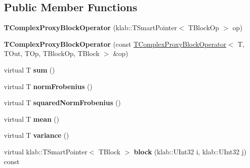 \subsection*{Public Member Functions}
\begin{DoxyCompactItemize}
\item 
{\bfseries T\+Complex\+Proxy\+Block\+Operator} (klab\+::\+T\+Smart\+Pointer$<$ T\+Block\+Op $>$ op)\hypertarget{classkl1p_1_1TComplexProxyBlockOperator_a2f962ad972aaf8f9b4702dd5d80eced9}{}\label{classkl1p_1_1TComplexProxyBlockOperator_a2f962ad972aaf8f9b4702dd5d80eced9}

\item 
{\bfseries T\+Complex\+Proxy\+Block\+Operator} (const \hyperlink{classkl1p_1_1TComplexProxyBlockOperator}{T\+Complex\+Proxy\+Block\+Operator}$<$ T, T\+Out, T\+Op, T\+Block\+Op, T\+Block $>$ \&op)\hypertarget{classkl1p_1_1TComplexProxyBlockOperator_a04722c553f55607508c6526e43ade887}{}\label{classkl1p_1_1TComplexProxyBlockOperator_a04722c553f55607508c6526e43ade887}

\item 
virtual T {\bfseries sum} ()\hypertarget{classkl1p_1_1TComplexProxyBlockOperator_aec11a1961928456a0fcf2d6e9fd72d48}{}\label{classkl1p_1_1TComplexProxyBlockOperator_aec11a1961928456a0fcf2d6e9fd72d48}

\item 
virtual T {\bfseries norm\+Frobenius} ()\hypertarget{classkl1p_1_1TComplexProxyBlockOperator_a3a616c71aca28467321febb8d5df0ab2}{}\label{classkl1p_1_1TComplexProxyBlockOperator_a3a616c71aca28467321febb8d5df0ab2}

\item 
virtual T {\bfseries squared\+Norm\+Frobenius} ()\hypertarget{classkl1p_1_1TComplexProxyBlockOperator_a0e4b35d5b1a497d46d2159f584f5887c}{}\label{classkl1p_1_1TComplexProxyBlockOperator_a0e4b35d5b1a497d46d2159f584f5887c}

\item 
virtual T {\bfseries mean} ()\hypertarget{classkl1p_1_1TComplexProxyBlockOperator_a29ff6ad7e91c57d31dd28c5c556c9dc5}{}\label{classkl1p_1_1TComplexProxyBlockOperator_a29ff6ad7e91c57d31dd28c5c556c9dc5}

\item 
virtual T {\bfseries variance} ()\hypertarget{classkl1p_1_1TComplexProxyBlockOperator_a7f84525e0f448b111affa97e4bea4108}{}\label{classkl1p_1_1TComplexProxyBlockOperator_a7f84525e0f448b111affa97e4bea4108}

\item 
virtual klab\+::\+T\+Smart\+Pointer$<$ T\+Block $>$ {\bfseries block} (klab\+::\+U\+Int32 i, klab\+::\+U\+Int32 j) const \hypertarget{classkl1p_1_1TComplexProxyBlockOperator_aa74e545e484dbcb075795c30eb67378b}{}\label{classkl1p_1_1TComplexProxyBlockOperator_aa74e545e484dbcb075795c30eb67378b}


\end{DoxyCompactItemize}
